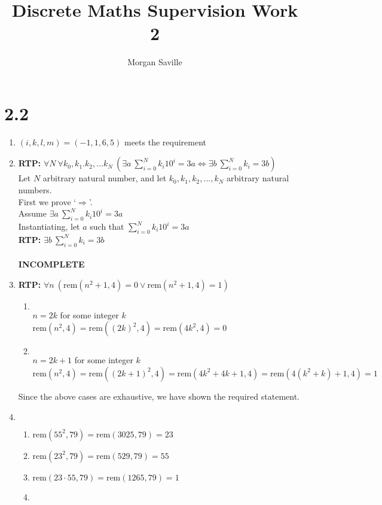 \documentclass{article}
\title{Discrete Maths Supervision Work 2}
\author{Morgan Saville}
\newcommand{\incomplete}{\textbf{\\ \\ INCOMPLETE}}
\newcommand{\rtp}{\textbf{RTP: }}
\newcommand{\myexists}[1]{\exists #1 \:}
\newcommand{\myforall}[1]{\forall #1 \:}
\newcommand{\rem}[2]{\textrm{rem}(#1, #2)}
\newcommand{\case}[1]{\item [\textbf{C#1}:]$ $ \\}
\begin{document}
    \maketitle
    
    \section{2.2}
    \begin{enumerate}
        \item $(i, k, l, m) = (-1, 1, 6, 5)$ meets the requirement
        \item \rtp $\myforall{N} \myforall{k_0,k_1.k_2,...k_N} (\myexists{a} \sum_{i=0}^{N}k_i 10^{i}=3a \iff \myexists{b} \sum_{i=0}^{N}k_i=3b)$\\
            Let $N$ arbitrary natural number, and let $k_0,k_1,k_2,...,k_N$ arbitrary natural numbers. \\
            First we prove `$\Rightarrow$'. \\
            Assume $\myexists{a} \sum_{i=0}^{N}k_i 10^{i}=3a$\\
            Instantiating, let $a$ such that $\sum_{i=0}^{N}k_i 10^{i}=3a$\\
            \rtp $\myexists{b} \sum_{i=0}^{N}k_i = 3b$
            \incomplete
        \item \rtp $\myforall{n} (\rem{n^2 + 1}{4}=0\lor\rem{n^2 + 1}{4}=1)$
            \begin{enumerate}
                \case{0} $n=2k$ for some integer $k$ \\
                    $\rem{n^2}{4} = \rem{(2k)^2}{4} = \rem{4k^2}{4} = 0$
                \case{1} $n=2k+1$ for some integer $k$ \\
                    $\rem{n^2}{4} = \rem{(2k+1)^2}{4} = \rem{4k^2 + 4k + 1}{4} = \rem{4(k^2 + k) + 1}{4} = 1$
            \end{enumerate}
            Since the above cases are exhaustive, we have shown the required statement.
        \item $ $
            \begin{enumerate}
                \item $\rem{55^2}{79} = \rem{3025}{79} = 23$
                \item $\rem{23^2}{79} = \rem{529}{79} = 55$
                \item $\rem{23\cdot 55}{79} = \rem{1265}{79} = 1$
                \item \begin{align*}

\end{align*}
\end{enumerate}
\end{enumerate}
\end{document}
